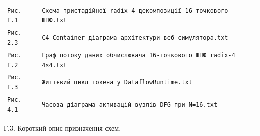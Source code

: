 \documentclass[
]{article}
\newcommand{\passthrough}[1]{#1}
\begin{document}
\begin{longtable}[]{@{}
  >{\raggedright\arraybackslash}p{}
  >{\raggedright\arraybackslash}p{}@{}}
\passthrough{\lstinline!Рис. !}\passthrough{\lstinline!Г.1!} &
\passthrough{\lstinline!Схема!}\passthrough{\lstinline! !}\passthrough{\lstinline!тристадійної!}\passthrough{\lstinline! !}\passthrough{\lstinline!radix!}\passthrough{\lstinline!-4!}\passthrough{\lstinline! !}\passthrough{\lstinline!декомпозиції!}\passthrough{\lstinline! !}\passthrough{\lstinline!16-точкового!}\passthrough{\lstinline! !}\passthrough{\lstinline!ШПФ.!}\passthrough{\lstinline!txt!} \\
\passthrough{\lstinline!Рис. 2.3!} &
\passthrough{\lstinline!C!}\passthrough{\lstinline!4!}\passthrough{\lstinline! !}\passthrough{\lstinline!Container!}\passthrough{\lstinline!-діаграма!}\passthrough{\lstinline! !}\passthrough{\lstinline!архітектури!}\passthrough{\lstinline! !}\passthrough{\lstinline!веб-симулятора.!}\passthrough{\lstinline!txt!} \\
\passthrough{\lstinline!Рис. !}\passthrough{\lstinline!Г.2!} &
\passthrough{\lstinline!Граф!}\passthrough{\lstinline! !}\passthrough{\lstinline!потоку!}\passthrough{\lstinline! !}\passthrough{\lstinline!даних!}\passthrough{\lstinline! !}\passthrough{\lstinline!обчислювача!}\passthrough{\lstinline! !}\passthrough{\lstinline!16-точкового!}\passthrough{\lstinline! !}\passthrough{\lstinline!ШПФ!}\passthrough{\lstinline! !}\passthrough{\lstinline!radix!}\passthrough{\lstinline!-4!}\passthrough{\lstinline! !}\passthrough{\lstinline!4×4.!}\passthrough{\lstinline!txt!} \\
\passthrough{\lstinline!Рис. !}\passthrough{\lstinline!Г.3!} &
\passthrough{\lstinline!Життєвий!}\passthrough{\lstinline! !}\passthrough{\lstinline!цикл!}\passthrough{\lstinline! !}\passthrough{\lstinline!токена!}\passthrough{\lstinline! !}\passthrough{\lstinline!у!}\passthrough{\lstinline! !}\passthrough{\lstinline!DataflowRuntime!}\passthrough{\lstinline!.!}\passthrough{\lstinline!txt!} \\
\passthrough{\lstinline!Рис. 4.1!} &
\passthrough{\lstinline!Часова!}\passthrough{\lstinline! !}\passthrough{\lstinline!діаграма!}\passthrough{\lstinline! !}\passthrough{\lstinline!активацій!}\passthrough{\lstinline! !}\passthrough{\lstinline!вузлів!}\passthrough{\lstinline! !}\passthrough{\lstinline!DFG!}\passthrough{\lstinline! !}\passthrough{\lstinline!при!}\passthrough{\lstinline! !}\passthrough{\lstinline!N!}\passthrough{\lstinline!=16.!}\passthrough{\lstinline!txt!} \\
\end{longtable}

Г.3. Короткий опис призначення схем.
\end{document}
